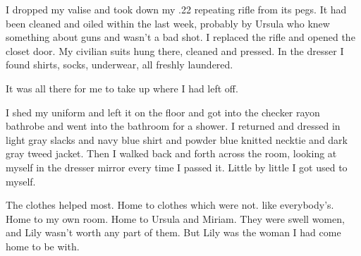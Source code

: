 {I dropped my valise and took down my .22 repeating rifle from its pegs. It had been cleaned and oiled within the last week, probably by Ursula who knew something about guns and wasn’t a bad shot. I replaced the rifle and opened the closet door. My civilian suits hung there, cleaned and pressed. In the dresser I found shirts, socks, underwear, all freshly laundered.

It was all there for me to take up where I had left off.

I shed my uniform and left it on the floor and got into the checker rayon bathrobe and went into the bathroom for a shower. I returned and dressed in light gray slacks and navy blue shirt and powder blue knitted necktie and dark gray tweed jacket. Then I walked back and forth across the room, looking at myself in the dresser mirror every time I passed it. Little by little I got used to myself.

The clothes helped most. Home to clothes which were not. like everybody’s. Home to my own room. Home to Ursula and Miriam. They were swell women, and Lily wasn’t worth any part of them. But Lily was the woman I had come home to be with.

}

\vspace{2\nbs}
\clearpage
\thispagestyle{empty}



